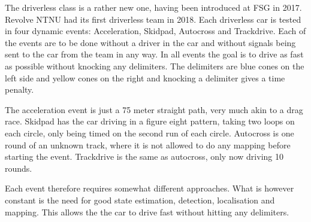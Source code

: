 The driverless class is a rather new one, having been introduced at \gls{FSG} in 2017. Revolve NTNU had its first driverless team in 2018. Each driverless car is tested in four dynamic events: Acceleration, Skidpad, Autocross and Trackdrive. Each of the events are to be done without a driver in the car and without signals being sent to the car from the team in any way. In all events the goal is to drive as fast as possible without knocking any delimiters. The delimiters are blue cones on the left side and yellow cones on the right and knocking a delimiter gives a time penalty.

The acceleration event is just a 75 meter straight path, very much akin to a drag race. Skidpad has the car driving in a figure eight pattern, taking two loops on each circle, only being timed on the second run of each circle. Autocross is one round of an unknown track, where it is not allowed to do any mapping before starting the event. Trackdrive is the same as autocross, only now driving 10 rounds. 

Each event therefore requires somewhat different approaches. What is however constant is the need for good state estimation, detection, localisation and mapping. This allows the the car to drive fast without hitting any delimiters.